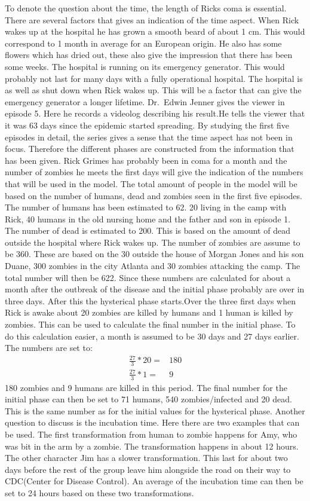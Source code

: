 \documentclass[%
twoside,                 %
final,                   %
10pt]{article}
\begin{document}
 To denote the question about the time, the length of Ricks coma is essential. There are several factors that gives an indication of the time aspect. When Rick wakes up at the hospital he has grown a smooth beard of about 1 cm. This would correspond to 1 month in average for an European origin. He also has some flowers which has dried out, these also give the impression that there has been some weeks. The hospital is running on its emergency generator. This would probably not last for many days with a fully operational hospital. The hospital is as well as shut down when Rick wakes up. This will be a factor that can give the emergency generator a longer lifetime. Dr.~Edwin Jenner gives the viewer in episode 5. Here he records a videolog describing his result.He tells the viewer that it was 63 days since the epidemic started spreading. By studying the first five episodes in detail, the series gives a sense that the time aspect has not been in focus. Therefore the different phases are constructed from the information that has been given. Rick Grimes has probably been in coma for a month and the number of zombies he meets the first days will give the indication of the numbers that will be used in the model. The total amount of people in the model will be based on the number of humans, dead and zombies seen in the first five episodes. The number of humans has been estimated to 62. 20 living in the camp with Rick, 40 humans in the old nursing home and the father and son in episode 1. The number of dead is estimated to 200. This is based on the amount of dead outside the hospital where Rick wakes up. The number of zombies are assume to be 360. These are based on the 30 outside the house of Morgan Jones and his son Duane, 300 zombies in the city Atlanta and 30 zombies attacking the camp. The total number will then be 622. Since these numbers are calculated for about a month after the outbreak of the disease and the initial phase probably are over in three days. After this the hysterical phase starts.Over the three first days when Rick is awake about 20 zombies are killed by humans and 1 human is killed by zombies. This can be used to calculate the final number in the initial phase. To do this calculation easier, a month is assumed to be 30 days and 27 days earlier. The numbers are set to:
\begin{align*}
\frac{27}{3}*20 =& 180\\
\frac{27}{3}*1 =& 9
\end{align*}
180 zombies and 9 humans are killed in this period. The final number for the initial phase can then be set to 71 humans, 540 zombies/infected and 20 dead. This is the same number as for the initial values for the hysterical phase. Another question to discuss is the incubation time. Here there are two examples that can be used. The first transformation from human to zombie happens for Amy, who was bit in the arm by a zombie. The transformation happens in about 12 hours. The other character Jim has a slower transformation. This last for about two days before the rest of the group leave him alongside the road on their way to CDC(Center for Disease Control). An average of the incubation time can then be set to 24 hours based on these two transformations.
\end{document}
